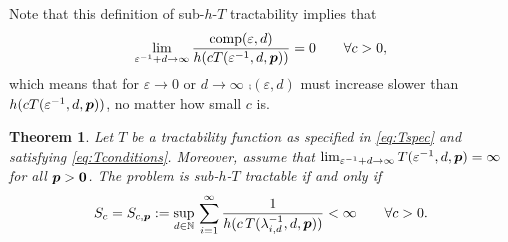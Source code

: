 \documentclass[sort&compress]{elsarticle}
\newtheorem{theorem}{Theorem}
\begin{document}
Note that this definition of sub-$h$-$T$ tractability implies that
\begin{equation} \label{eq:comp_slow_hcT}
		\lim_{\varepsilon^{-1} + d \to \infty} \frac{\operatorname{comp}(\varepsilon,d)}{h(cT(\varepsilon^{-1},d,\boldsymbol{p}))} = 0 \qquad \forall c > 0,
\end{equation}
which means that for $\varepsilon \to 0$ or $d \to \infty$  $\comp(\varepsilon,d)$ must increase slower than $h(cT(\varepsilon^{-1},d,\boldsymbol{p}))$, no matter how small $c$ is.

\begin{theorem}\label{thm:subhT}
	Let $T$ be a tractability function as specified in \eqref{eq:Tspec} and satisfying \eqref{eq:Tconditions}.  Moreover, assume that 
    $\lim_{\varepsilon^{-1} + d \to \infty} T(\varepsilon^{-1},d,\boldsymbol{p}) = \infty$
    for all $\boldsymbol{p} > \boldsymbol{0}$.  The problem is sub-$h$-$T$ tractable if and only if
	\[
	S_c = S_{c,\boldsymbol{p}} :=\sup_{d\in\mathbb{N}}  \, \sum_{i=1}^\infty \frac1{h(c\, T(\lambda_{i,d}^{-1},d,\boldsymbol{p}))} <\infty \qquad \forall c > 0.
	\]
\end{theorem}
\end{document}
